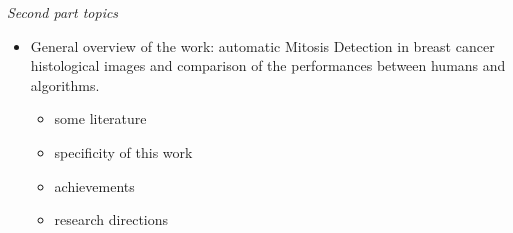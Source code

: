 \vspace{0.5cm}


\emph{Second part topics}

\begin{itemize}
\item General overview of the work: automatic Mitosis Detection in breast cancer histological images and comparison of the performances between humans and algorithms.
	\begin{itemize}
	\item some literature
	\item specificity of this work
	\item achievements
	\item research directions
	\end{itemize}
\end{itemize}




